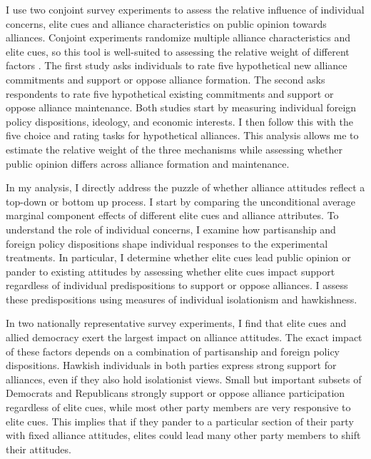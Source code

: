 \documentclass[12pt]{article}
\begin{document}
I use two conjoint survey experiments to assess the relative influence of individual concerns, elite cues and alliance characteristics on public opinion towards alliances. 
Conjoint experiments randomize multiple alliance characteristics and elite cues, so this tool is well-suited to assessing the relative weight of different factors \citep{Hainmuelleretal2014}.
The first study asks individuals to rate five hypothetical new alliance commitments and support or oppose alliance formation.
The second asks respondents to rate five hypothetical existing commitments and support or oppose alliance maintenance. 
Both studies start by measuring individual foreign policy dispositions, ideology, and economic interests. 
I then follow this with the five choice and rating tasks for hypothetical alliances. 
This analysis allows me to estimate the relative weight of the three mechanisms while assessing whether public opinion differs across alliance formation and maintenance.  


In my analysis, I directly address the puzzle of whether alliance attitudes reflect a top-down or bottom up process. 
I start by comparing the unconditional average marginal component effects of different elite cues and alliance attributes.
To understand the role of individual concerns, I examine how partisanship and foreign policy dispositions shape individual responses to the experimental treatments. 
In particular, I determine whether elite cues lead public opinion or pander to existing attitudes by assessing whether elite cues impact support regardless of individual predispositions to support or oppose alliances.
I assess these predispositions using measures of individual isolationism and hawkishness. 


In two nationally representative survey experiments, I find that elite cues and allied democracy exert the largest impact on alliance attitudes. 
The exact impact of these factors depends on a combination of partisanship and foreign policy dispositions.
Hawkish individuals in both parties express strong support for alliances, even if they also hold isolationist views.
Small but important subsets of Democrats and Republicans strongly support or oppose alliance participation regardless of elite cues, while most other party members are very responsive to elite cues. 
This implies that if they pander to a particular section of their party with fixed alliance attitudes, elites could lead many other party members to shift their attitudes. 
\end{document}
